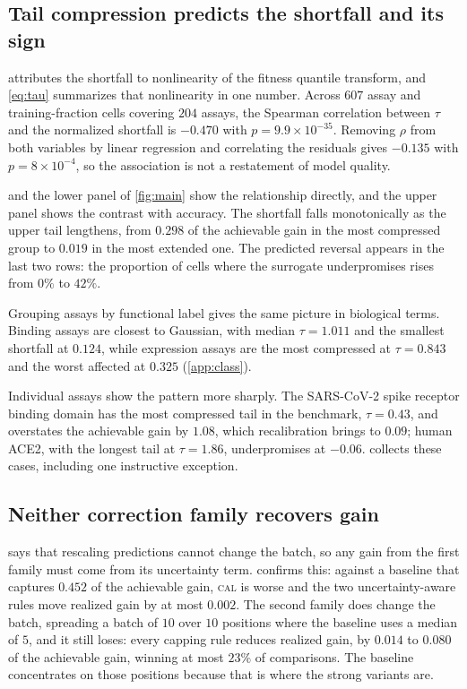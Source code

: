 \documentclass{article}
\theoremstyle{plain}
\theoremstyle{definition}
\begin{document}
\subsection{Tail compression predicts the shortfall and its sign}
\label{sec:results-tau}

 attributes the shortfall to nonlinearity of the fitness quantile
transform, and \cref{eq:tau} summarizes that nonlinearity in one number. Across $607$
assay and training-fraction cells covering $204$ assays, the Spearman correlation
between $\tau$ and the normalized shortfall is $-0.470$ with $p = 9.9 \times 10^{-35}$.
Removing $\rho$ from both variables by linear regression and correlating the residuals
gives $-0.135$ with $p = 8 \times 10^{-4}$, so the association is not a restatement of
model quality.

 and the lower panel of \cref{fig:main} show the relationship directly,
and the upper panel shows the contrast with accuracy. The shortfall falls monotonically as
the upper tail lengthens, from $0.298$ of the achievable gain in the most compressed
group to $0.019$ in the most extended one. The predicted reversal appears in the last
two rows: the proportion of cells where the surrogate underpromises rises from $0\%$ to
$42\%$.


Grouping assays by functional label gives the same picture in biological terms. Binding
assays are closest to Gaussian, with median $\tau = 1.011$ and the smallest shortfall at
$0.124$, while expression assays are the most compressed at $\tau = 0.843$ and the worst
affected at $0.325$ \mbox{(\cref{app:class})}.

Individual assays show the pattern more sharply. The SARS-CoV-2 spike receptor binding
domain has the most compressed tail in the benchmark, $\tau = 0.43$, and overstates the
achievable gain by $1.08$, which recalibration brings to $0.09$; human ACE2, with the
longest tail at $\tau = 1.86$, underpromises at $-0.06$.  collects
these cases, including one instructive exception.


\subsection{Neither correction family recovers gain}
\label{sec:results-fix}

 says that rescaling predictions cannot change the batch, so any
gain from the first family must come from its uncertainty term. 
confirms this: against a baseline that captures $0.452$ of the achievable gain,
\textsc{cal} is worse and the two uncertainty-aware rules move realized gain by at most
$0.002$. The second family does change the batch, spreading a batch of $10$ over $10$
positions where the baseline uses a median of $5$, and it still loses: every capping
rule reduces realized gain, by $0.014$ to $0.080$ of the achievable gain, winning at
most $23\%$ of comparisons. The baseline concentrates on those positions because that
is where the strong variants are.
\end{document}
